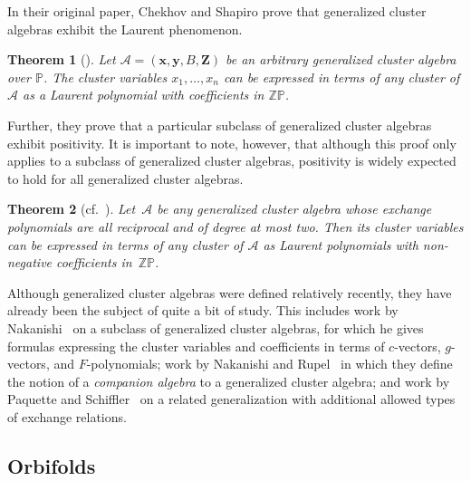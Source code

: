 \documentclass[pdftex]{sigma}%
\numberwithin{equation}{section}
\newtheorem{Theorem}{Theorem}[section]
\begin{document}
In their original paper, Chekhov and Shapiro prove that generalized cluster algebras exhibit the Laurent phenomenon.

\begin{Theorem}[{\cite[Theorem 2.5]{Chekhov-Shapiro}}]
\label{CS-LP}
Let $\mathcal{A} = (\mathbf{x}, \mathbf{y}, B, \mathbf{Z})$ be an arbitrary generalized cluster algebra over $\mathbb{P}$. The cluster variables $x_1, \dots, x_n$ can be expressed in terms of any cluster of $\mathcal{A}$ as a Laurent polynomial with coefficients in $\mathbb{ZP}$.
\end{Theorem}

Further, they prove that a particular subclass of generalized cluster algebras exhibit positivity. It is important to note, however, that although this proof only applies to a subclass of generalized cluster algebras, positivity is widely expected to hold for all generalized cluster algebras.

\begin{Theorem}[{cf.\ \cite[Section 5]{Chekhov-Shapiro}}]\label{CS-reciprocalDeg2}
Let~$\mathcal{A}$ be any generalized cluster algebra whose exchange polynomials are all reciprocal and of degree at most two. Then its cluster variables can be expressed in terms of any cluster of $\mathcal{A}$ as Laurent polynomials with non-negative coefficients in~$\mathbb{ZP}$.
\end{Theorem}

Although generalized cluster algebras were defined relatively recently, they have already been the subject of quite a bit of study. This includes work by Nakanishi~\cite{Nakanishi} on a subclass of generalized cluster algebras, for which he gives formulas expressing the cluster variables and coefficients in terms of $c$-vectors, $g$-vectors, and $F$-polynomials; work by Nakanishi and Rupel~\cite{Nakanishi-Rupel} in which they define the notion of a \emph{companion algebra} to a generalized cluster algebra; and work by Paquette and Schiffler~\cite{Paquette-Schiffler} on a related generalization with additional allowed types of exchange relations.

\subsection{Orbifolds}\label{sec:orbifolds}
\end{document}
